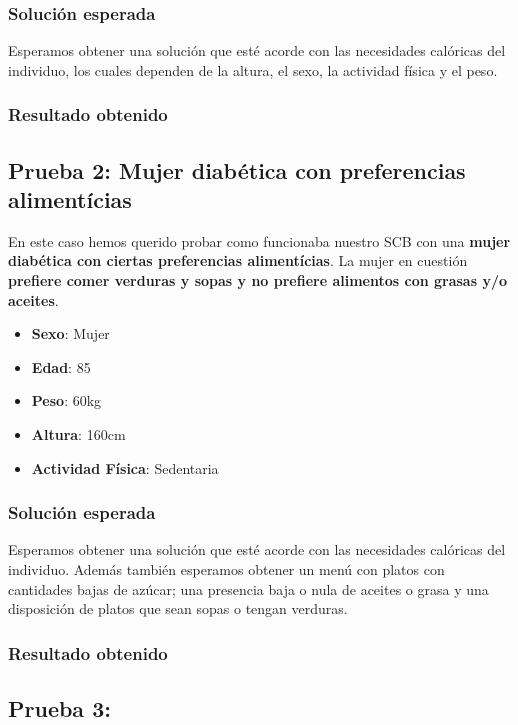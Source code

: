 \documentclass[12]{article}
\begin{document}
\subsubsection{Solución esperada}
Esperamos obtener una solución que esté acorde con las necesidades calóricas del individuo, los cuales dependen de la altura, el sexo, la actividad física y el peso.

\subsubsection{Resultado obtenido}

\subsection{Prueba 2: Mujer diabética con preferencias alimentícias}
En este caso hemos querido probar como funcionaba nuestro SCB con una \textbf{mujer diabética con ciertas preferencias alimentícias}. La mujer en cuestión \textbf{prefiere comer verduras y sopas y no prefiere alimentos con grasas y/o aceites}.  

\begin{itemize}
\item \textbf{Sexo}: Mujer
\item \textbf{Edad}: 85
\item \textbf{Peso}: 60kg
\item \textbf{Altura}: 160cm
\item \textbf{Actividad Física}: Sedentaria
\end{itemize}

\subsubsection{Solución esperada}
Esperamos obtener una solución que esté acorde con las necesidades calóricas del individuo. Además también esperamos obtener un menú con platos con cantidades bajas de azúcar; una presencia baja o nula de aceites o grasa y una disposición de platos que sean sopas o tengan verduras.

\subsubsection{Resultado obtenido}

\subsection{Prueba 3: }
\end{document}
